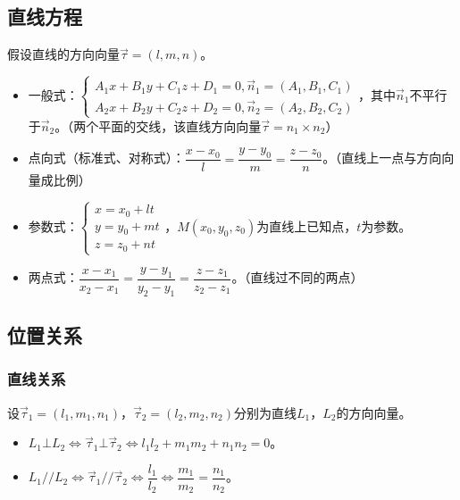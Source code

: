 \documentclass[UTF8, 12pt]{ctexart}
\begin{document}
\subsection{直线方程}

假设直线的方向向量$\vec{\tau}=(l,m,n)$。

\begin{itemize}
    \item 一般式：$\left\{\begin{array}{l}
        A_1x+B_1y+C_1z+D_1=0,\vec{n}_1=(A_1,B_1,C_1) \\
        A_2x+B_2y+C_2z+D_2=0,\vec{n}_2=(A_2,B_2,C_2)
    \end{array}\right.$，其中$\vec{n}_1$不平行于$\vec{n}_2$。（两个平面的交线，该直线方向向量$\vec{\tau}=n_1\times n_2$）
    \item 点向式（标准式、对称式）：$\dfrac{x-x_0}{l}=\dfrac{y-y_0}{m}=\dfrac{z-z_0}{n}$。（直线上一点与方向向量成比例）
    \item 参数式：$\left\{\begin{array}{l}
        x=x_0+lt \\
        y=y_0+mt \\
        z=z_0+nt
    \end{array}\right.$，$M(x_0,y_0,z_0)$为直线上已知点，$t$为参数。
    \item 两点式：$\dfrac{x-x_1}{x_2-x_1}=\dfrac{y-y_1}{y_2-y_1}=\dfrac{z-z_1}{z_2-z_1}$。（直线过不同的两点）
\end{itemize}

\subsection{位置关系}

\subsubsection{直线关系}

设$\vec{\tau}_1=(l_1,m_1,n_1)$，$\vec{\tau}_2=(l_2,m_2,n_2)$分别为直线$L_1$，$L_2$的方向向量。

\begin{itemize}
    \item $L_1\bot L_2\Leftrightarrow\vec{\tau}_1\bot\vec{\tau}_2\Leftrightarrow l_1l_2+m_1m_2+n_1n_2=0$。
    \item $L_1//L_2\Leftrightarrow\vec{\tau}_1//\vec{\tau}_2\Leftrightarrow\dfrac{l_1}{l_2}\Leftrightarrow\dfrac{m_1}{m_2}=\dfrac{n_1}{n_2}$。
\end{itemize}
\end{document}
